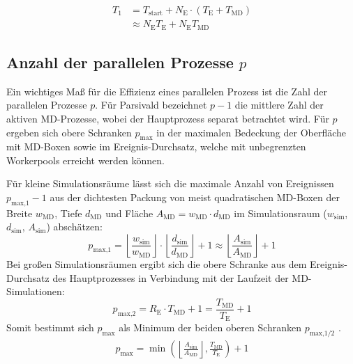 \begin{align}
  T_1 & = T_\text{start} + N_\text{E} \cdot (T_\text{E} + T_\text{MD}) \\
      & \approx N_\text{E} T_\text{E} + N_\text{E} T_\text{MD}
\end{align}

\subsection{Anzahl der parallelen Prozesse $p$}

Ein wichtiges Maß für die Effizienz eines parallelen Prozess ist die Zahl der parallelen Prozesse $p$.
Für Parsivald bezeichnet $p-1$ die mittlere Zahl der aktiven MD-Prozesse, wobei der Hauptprozess separat betrachtet wird.
Für $p$ ergeben sich obere Schranken $p_\text{max}$ in der maximalen Bedeckung der Oberfläche mit MD-Boxen sowie im Ereignis-Durchsatz, welche mit unbegrenzten Workerpools erreicht werden können.

Für kleine Simulationsräume lässt sich die maximale Anzahl von Ereignissen $p_\text{max,1}-1$ aus der dichtesten Packung von meist quadratischen MD-Boxen der Breite $w_\text{MD}$, Tiefe $d_\text{MD}$ und Fläche $A_\text{MD} = w_\text{MD} \cdot d_\text{MD}$ im Simulationsraum ($w_\text{sim}$, $d_\text{sim}$, $A_\text{sim}$) abschätzen:
\begin{equation}
  p_\text{max,1} = \left\lfloor\frac{w_\text{sim}}{w_\text{MD}}\right\rfloor \cdot \left\lfloor\frac{d_\text{sim}}{d_\text{MD}}\right\rfloor + 1 \approx \left\lfloor\frac{A_\text{sim}}{A_\text{MD}}\right\rfloor + 1
  \label{eq:pmax1}
\end{equation}
Bei großen Simulationsräumen ergibt sich die obere Schranke aus dem Ereignis-Durchsatz des Hauptprozesses in Verbindung mit der Laufzeit der MD-Simulationen:
\begin{equation}
  p_\text{max,2} = R_\text{E} \cdot T_\text{MD} + 1 = \frac{T_\text{MD}}{T_\text{E}} + 1
  \label{eq:pmax2}
\end{equation}
Somit bestimmt sich $p_\text{max}$ als Minimum der beiden oberen Schranken $p_\text{max,1/2}$ .
\begin{align}
  p_\text{max} = \min\left(\left\lfloor\frac{A_\text{sim}}{A_\text{MD}}\right\rfloor, \frac{T_\text{MD}}{T_\text{E}}\right) + 1
\end{align}

